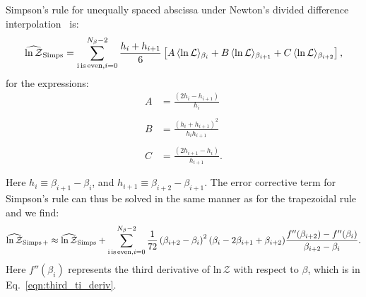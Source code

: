 Simpson's rule for unequally spaced abscissa under Newton's divided difference interpolation~\citep{easa1988area} is:
\begin{equation}
    \widehat{\mathrm{ln} \, \mathcal{Z}}_{\mathrm{Simps}} = \sum_{\mathrm{i\, is\, even}, \\ i=0}^{N_\beta-2} \frac{h_i + h_{i+1}}{6} \left [ A \, \langle \mathrm{ln} \, \mathcal{L} \rangle_{\beta_{i}} + B \, \langle \mathrm{ln} \, \mathcal{L} \rangle_{\beta_{i+1}} + C \, \langle \mathrm{ln} \, \mathcal{L} \rangle_{\beta_{i+2}}\right ],
\end{equation}
for the expressions:
\begin{equation}
\begin{array}{lll}
     A &= \frac{(2h_i - h_{i+1})}{h_i} \\ \\ 
     B &= \frac{(h_i+h_{i+1})^2}{h_i h_{i+1}} \\ \\
     C &= \frac{(2h_{i+1} - h_i)}{h_{i+1}}. \\ \\
\end{array}
\end{equation}
Here  $h_i \equiv \beta_{i+1} - \beta_i$, and $h_{i+1} \equiv \beta_{i+2} - \beta_{i+1}$. The error corrective term for Simpson's rule can thus be solved in the same manner as for the trapezoidal rule and we find:
\begin{equation}
    \widehat{\mathrm{ln} \, \mathcal{Z}}_{\mathrm{Simps \, +}} \approx \widehat{\mathrm{ln} \, \mathcal{Z}}_{\mathrm{Simps}} + \sum_{\mathrm{i\, is\, even}, \\ i=0}^{N_\beta-2} \frac{1}{72}\left(\beta_{i+2} - \beta_{i} \right)^2 (\beta_i - 2\beta_{i+1} + \beta_{i+2})\frac{f''(\beta_{i+2}) - f''(\beta_i)}{\beta_{i+2} - \beta_i}.
\end{equation}
Here $f''(\beta_i)$ represents the third derivative of $\mathrm{ln} \, \mathcal{Z}$ with respect to $\beta$, which is in Eq.~\ref{eqn:third_ti_deriv}.

